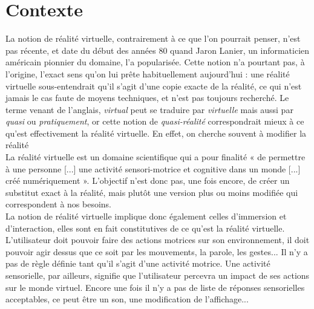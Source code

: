 \section{Contexte}


\begin{comment}Introduction plus générale, dans le monde de l’informatique, pas que le projet, définitions associées (RV, interactions, immersion, domotique)
Qqes éléments sur l’impact sociétal de l’aide à la personne 
Présentation sujet (fait le lien), partenariat INSA/Kerpape/(3è partenaire) ; mettre en avant le fait que demandeur extérieur \end{comment}

	La notion de réalité virtuelle, contrairement à ce que l'on pourrait penser, n'est pas récente, et date du début des années 80 quand Jaron Lanier, un informaticien américain pionnier du domaine, l'a popularisée. Cette notion n'a pourtant pas, à l'origine, l'exact sens qu'on lui prête habituellement aujourd'hui : une réalité virtuelle sous-entendrait qu'il s'agit d'une copie exacte de la réalité, ce qui n'est jamais le cas faute de moyens techniques, et n'est pas toujours recherché. Le terme venant  de l'anglais, \emph{virtual} peut se traduire par \emph{virtuelle} mais aussi par \emph{quasi} ou \emph{pratiquement}, or cette notion de \emph{quasi-réalité} correspondrait mieux à ce qu'est effectivement la réalité virtuelle. En effet, on cherche souvent à modifier la réalité %
\\

	La réalité virtuelle est un domaine scientifique qui a pour finalité « de permettre à une personne [...] une activité sensori-motrice et cognitive dans un monde [...] créé numériquement ». 
L'objectif n'est donc pas, une fois encore, de créer un substitut exact à la réalité, mais plutôt une version plus ou moins modifiée qui correspondent à nos besoins. 
\\

	La notion de réalité virtuelle implique donc également celles d'immersion et d'interaction, elles sont en fait constitutives de ce  qu'est la réalité virtuelle. L'utilisateur doit pouvoir faire des actions motrices sur son environnement, il doit pouvoir agir dessus que ce soit par les mouvements, la parole, les gestes... Il n'y a pas de règle définie tant qu'il s'agit d'une activité motrice. 
	Une activité sensorielle, par ailleurs, signifie que l'utilisateur percevra un impact de ses actions sur le monde virtuel. Encore une fois il n'y a pas de liste de réponses sensorielles acceptables, ce peut être un son, une modification de l'affichage...	%